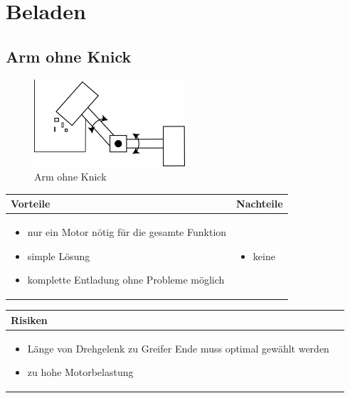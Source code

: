 
\section{Beladen}


\subsection{Arm ohne Knick}
\begin{figure} [hbp]
	\centering
	\includegraphics[width=0.5\textwidth]{fig/Beladen_1.png}
	\caption{Arm ohne Knick}
\end{figure}

\begin{table}[h]
\begin{tabular}{p{} | p{}}


 \textbf{Vorteile} & \textbf{Nachteile} \\ \hline
	 
\begin{itemize}
\item nur ein Motor nötig für die gesamte Funktion
\item simple Lösung
\item komplette Entladung ohne Probleme möglich
\end{itemize}

 
 &
 
\begin{itemize}
\item keine
\end{itemize}

\end{tabular}
\end{table}

\begin{table}[h]
\begin{tabular}{p{}p{}}


 \textbf{Risiken} & \\ \hline
	 
\begin{itemize}
\item Länge von Drehgelenk zu Greifer Ende muss optimal gewählt werden
\item zu hohe Motorbelastung
\end{itemize}
 
\end{tabular}
\end{table}

